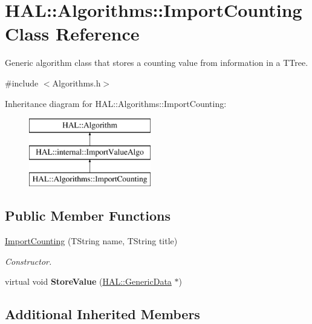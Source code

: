 \hypertarget{class_h_a_l_1_1_algorithms_1_1_import_counting}{\section{H\-A\-L\-:\-:Algorithms\-:\-:Import\-Counting Class Reference}
\label{class_h_a_l_1_1_algorithms_1_1_import_counting}
}


Generic algorithm class that stores a counting value from information in a T\-Tree.  




{\ttfamily \#include $<$Algorithms.\-h$>$}

Inheritance diagram for H\-A\-L\-:\-:Algorithms\-:\-:Import\-Counting\-:\begin{figure}[H]
\begin{center}
\leavevmode
\includegraphics[height=3.000000cm]{class_h_a_l_1_1_algorithms_1_1_import_counting}
\end{center}
\end{figure}
\subsection*{Public Member Functions}
\begin{DoxyCompactItemize}
\item 
\hyperlink{class_h_a_l_1_1_algorithms_1_1_import_counting_a533c67ebac3fbcb71c800ccb794bdf24}{Import\-Counting} (T\-String name, T\-String title)
\begin{DoxyCompactList}\small\item\em Constructor. \end{DoxyCompactList}\item 
\hypertarget{class_h_a_l_1_1_algorithms_1_1_import_counting_a5c11aa12b91c4fbe66a76d4acbfd0033}{virtual void {\bfseries Store\-Value} (\hyperlink{class_h_a_l_1_1_generic_data}{H\-A\-L\-::\-Generic\-Data} $\ast$)}\label{class_h_a_l_1_1_algorithms_1_1_import_counting_a5c11aa12b91c4fbe66a76d4acbfd0033}

\end{DoxyCompactItemize}
\subsection*{Additional Inherited Members}


